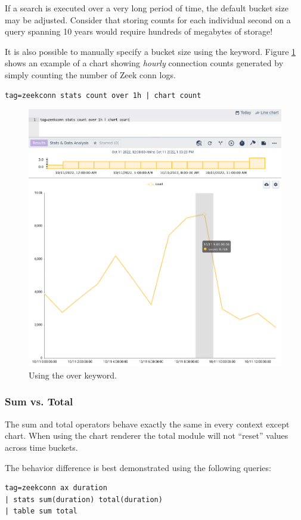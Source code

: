 If a search is executed over a very long period of time, the default bucket size may be adjusted. Consider that storing counts for each individual second on a query spanning 10 years would require hundreds of megabytes of storage!

It is also possible to manually specify a bucket size using the  keyword. Figure \ref{fig:stats-over} shows an example of a chart showing \emph{hourly} connection counts generated by simply counting the number of Zeek conn logs.

\begin{verbatim}
tag=zeekconn stats count over 1h | chart count
\end{verbatim}

\begin{figure}
	\includegraphics[width=0.8\linewidth]{images/stats-over.png}
	\caption{Using the over keyword.}
	\label{fig:stats-over}
\end{figure}


\subsubsection{Sum vs. Total}

The sum and total operators behave exactly the same in every context except chart. When using the chart renderer the total module will not ``reset'' values across time buckets.

The behavior difference is best demonstrated using the following queries:

\begin{verbatim}
tag=zeekconn ax duration
| stats sum(duration) total(duration)
| table sum total
\end{verbatim}

